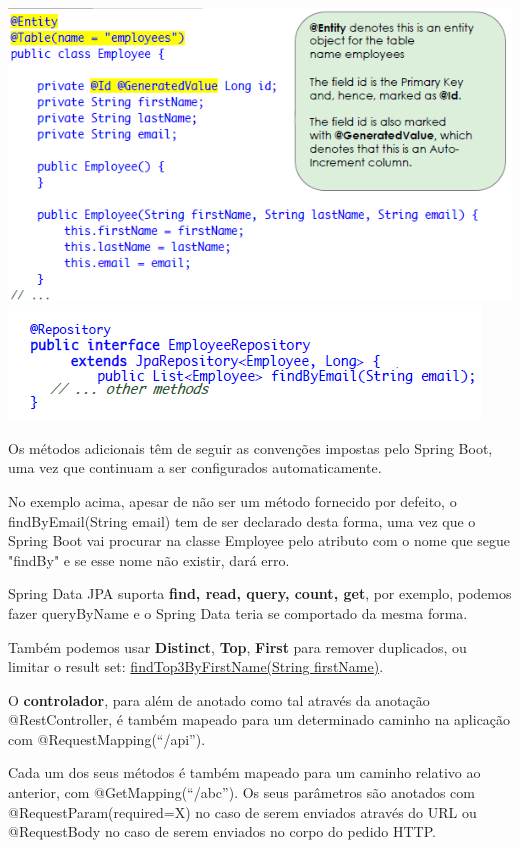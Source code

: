 \documentclass{article}
\begin{document}
\begin{center}
  \includegraphics[scale=0.5]{92}
  \includegraphics[scale=0.5]{93}
\end{center}

Os métodos adicionais têm de seguir as convenções impostas pelo Spring Boot, uma vez que continuam a ser
configurados automaticamente.

No exemplo acima, apesar de não ser um método fornecido por defeito, o findByEmail(String email) tem de ser
declarado desta forma, uma vez que o Spring Boot vai procurar na classe Employee pelo atributo com o nome que
segue "findBy" e se esse nome não existir, dará erro.

Spring Data JPA suporta \textbf{find, read, query, count, get},
por exemplo, podemos fazer queryByName e o Spring Data
teria se comportado da mesma forma.

Também podemos usar \textbf{Distinct}, \textbf{Top}, \textbf{First} para remover duplicados,
ou limitar o result set: \uline{findTop3ByFirstName(String firstName)}.

\pagebreak

O \textbf{controlador}, para além de anotado como tal através da anotação
@RestController, é também mapeado para um determinado caminho na
aplicação com @RequestMapping(“/api”). 

Cada um dos seus métodos é também mapeado para um caminho relativo ao anterior, com
@GetMapping(“/abc”). Os seus parâmetros são anotados com @RequestParam(required=X) no
caso de serem enviados através do URL ou @RequestBody no caso de serem enviados no
corpo do pedido HTTP.
\end{document}
